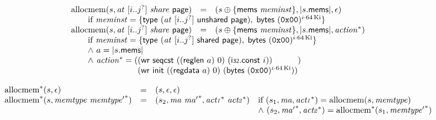 $$
\begin{array}[t]{@{}lcl@{}l@{}}
{\mathrm{allocmem}}(s, {\mathit{at}}~{}[ i .. {j^?} ]~{\mathit{share}}~\mathsf{page}) & = & (s \oplus \{ \mathsf{mems}~{\mathit{meminst}} \}, {|s{.}\mathsf{mems}|}, \epsilon) &  \\
 \multicolumn{4}{@{}l@{}}{\quad
\quad \mbox{if}~ {\mathit{meminst}} = \{ \mathsf{type}~({\mathit{at}}~{}[ i .. {j^?} ]~\mathsf{unshared}~\mathsf{page}),\;\allowbreak \mathsf{bytes}~{(\mathtt{0x00})^{i \cdot 64 \, {\mathrm{Ki}}}} \}
} \\
{\mathrm{allocmem}}(s, {\mathit{at}}~{}[ i .. {j^?} ]~{\mathit{share}}~\mathsf{page}) & = & (s \oplus \{ \mathsf{mems}~{\mathit{meminst}} \}, {|s{.}\mathsf{mems}|}, {{\mathit{action}}^\ast}) &  \\
 \multicolumn{4}{@{}l@{}}{\quad
\quad
\begin{array}[t]{@{}l@{}}
\mbox{if}~ {\mathit{meminst}} = \{ \mathsf{type}~({\mathit{at}}~{}[ i .. {j^?} ]~\mathsf{shared}~\mathsf{page}),\; \mathsf{bytes}~{(\mathtt{0x00})^{i \cdot 64 \, {\mathrm{Ki}}}} \} \\
{\land}~ a = {|s{.}\mathsf{mems}|} \\
{\land}~ {{\mathit{action}}^\ast} = (\begin{array}[t]{@{}l@{}} (\mathsf{wr}~\mathsf{seqcst}~((\mathsf{reglen}~a)~0)~(\mathsf{i{\scriptstyle 32}}{.}\mathsf{const}~i)) \\
  (\mathsf{wr}~\mathsf{init}~((\mathsf{regdata}~a)~0)~(\mathsf{bytes}~{(\mathtt{0x00})^{i \cdot 64 \, {\mathrm{Ki}}}})) \end{array}) \\
\end{array}
} \\
\end{array}
$$

$$
\begin{array}[t]{@{}lcl@{}l@{}}
{{{\mathrm{allocmem}}^\ast}}{(s, \epsilon)} & = & (s, \epsilon, \epsilon) \\
{{{\mathrm{allocmem}}^\ast}}{(s, {\mathit{memtype}}~{{\mathit{memtype}'}^\ast})} & = & (s_2, {\mathit{ma}}~{{\mathit{ma}'}^\ast}, {{\mathit{act{\kern-0.1em\scriptstyle 1}}}^\ast}~{{\mathit{act{\kern-0.1em\scriptstyle 2}}}^\ast}) & \quad
\begin{array}[t]{@{}l@{}}
\mbox{if}~ (s_1, {\mathit{ma}}, {{\mathit{act{\kern-0.1em\scriptstyle 1}}}^\ast}) = {\mathrm{allocmem}}(s, {\mathit{memtype}}) \\
{\land}~ (s_2, {{\mathit{ma}'}^\ast}, {{\mathit{act{\kern-0.1em\scriptstyle 2}}}^\ast}) = {{{\mathrm{allocmem}}^\ast}}{(s_1, {{\mathit{memtype}'}^\ast})} \\
\end{array} \\
\end{array}
$$

